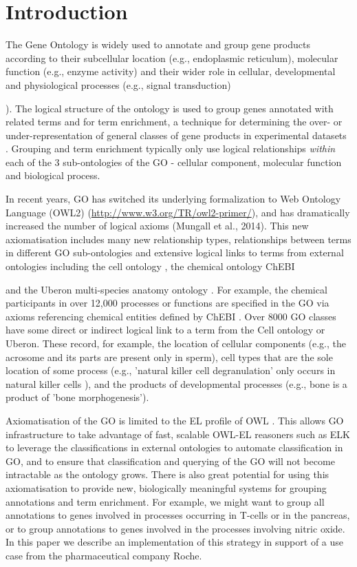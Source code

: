 \documentclass[runningheads,a4paper]{llncs}
\begin{document}
\section{Introduction}


The Gene Ontology is widely used to annotate and group gene products according to their subcellular location (e.g., endoplasmic reticulum), molecular function (e.g., enzyme activity) and their wider role in cellular, developmental and physiological processes (e.g., signal transduction) {\cite{GO2015}). The logical structure of the ontology is used to group genes annotated with related terms and for term enrichment, a technique for determining the over- or under-representation of general classes of gene products in experimental datasets \cite{Shah2012}. Grouping and term enrichment typically only use logical relationships \textit{within} each of the 3 sub-ontologies of the GO - cellular component, molecular function and biological process.

In recent years, GO has switched its underlying formalization to Web Ontology Language (OWL2) (\url{http://www.w3.org/TR/owl2-primer/}), and has dramatically increased the number of logical axioms (Mungall et al., 2014). This new axiomatisation includes many new relationship types, relationships between terms in different GO sub-ontologies and extensive logical links to terms from external ontologies including the cell ontology \cite{Meehan2011}, the chemical ontology ChEBI {\cite{Hastings2013} and the Uberon multi-species anatomy ontology \cite{Haendel2014}.  For example, the chemical participants in over 12,000 processes or functions are specified in the GO via axioms referencing chemical entities defined by ChEBI \cite{Hill2013}. Over 8000 GO classes have some direct or indirect logical link to a term from the Cell ontology or Uberon. These record, for example, the location of cellular components (e.g., the acrosome and its parts are present only in sperm), cell types that are the sole location of some process (e.g., 'natural killer cell degranulation' only occurs in natural killer cells ), and the products of developmental processes (e.g., bone is a product of 'bone morphogenesis').

Axiomatisation of the GO is limited to the EL profile of OWL \cite{Mungall2014}. This allows GO infrastructure to take advantage of fast, scalable OWL-EL reasoners such as ELK \cite{kazakov2012} to leverage the classifications in external ontologies to automate classification in GO, and to ensure that classification and querying of the GO will not become intractable as the ontology grows.  There is also great potential for using this axiomatisation to provide new, biologically meaningful systems for grouping annotations and term enrichment.  For example, we might want to group all annotations to genes involved in processes occurring in T-cells or in the pancreas, or to group annotations to genes involved in the processes involving nitric oxide.  In this paper we describe an implementation of this strategy in support of a use case from the pharmaceutical company Roche.

}}
\end{document}
